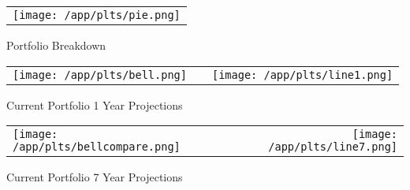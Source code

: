 \documentclass{article}
\begin{document}
\begin{adjustwidth}{-.3in}{0in}%
\vspace*{-1cm}

\begin{center}
  \begin{tabular}{c}
    \texttt{[image: /app/plts/pie.png]}
  \end{tabular}
  \end{center}

  \begin{center}
        Portfolio Breakdown
  \end{center}

\vspace{.7cm}


\begin{center}
  \begin{tabular}{lcr}
  \texttt{[image: /app/plts/bell.png]}
    & \hspace{1cm }&\texttt{[image: /app/plts/line1.png]}
  \end{tabular}
  \end{center}

  \begin{center}
      Current Portfolio 1 Year Projections
  \end{center}

  \vspace{.7cm}


\begin{center}
  \begin{tabular}{lcr}
  \texttt{[image: /app/plts/bellcompare.png]}
    & \hspace{1cm }&\texttt{[image: /app/plts/line7.png]}
  \end{tabular}
  \end{center}

  \begin{center}
      Current Portfolio 7 Year Projections
  \end{center}

 \vspace{.6cm}

\end{adjustwidth}
\end{document}
